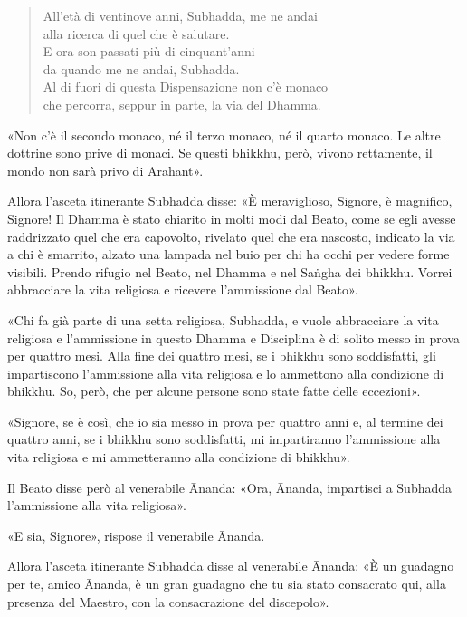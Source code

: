 \begin{quote}
All’età di ventinove anni, Subhadda, me ne andai \\
alla ricerca di quel che è salutare. \\
E ora son passati più di cinquant’anni \\
da quando me ne andai, Subhadda. \\
Al di fuori di questa Dispensazione non c’è monaco \\
che percorra, seppur in parte, la via del Dhamma.
\end{quote}

«Non c’è il secondo monaco, né il terzo monaco, né il quarto monaco. Le altre
dottrine sono prive di monaci. Se questi bhikkhu, però, vivono rettamente, il
mondo non sarà privo di Arahant».

Allora l’asceta itinerante Subhadda disse: «È meraviglioso, Signore, è
magnifico, Signore! Il Dhamma è stato chiarito in molti modi dal Beato, come se
egli avesse raddrizzato quel che era capovolto, rivelato quel che era nascosto,
indicato la via a chi è smarrito, alzato una lampada nel buio per chi ha occhi
per vedere forme visibili. Prendo rifugio nel Beato, nel Dhamma e nel Saṅgha dei
bhikkhu. Vorrei abbracciare la vita religiosa e ricevere l’ammissione dal
Beato».

«Chi fa già parte di una setta religiosa, Subhadda, e vuole abbracciare la vita
religiosa e l’ammissione in questo Dhamma e Disciplina è di solito messo in
prova per quattro mesi. Alla fine dei quattro mesi, se i bhikkhu sono
soddisfatti, gli impartiscono l’ammissione alla vita religiosa e lo ammettono
alla condizione di bhikkhu. So, però, che per alcune persone sono state fatte
delle eccezioni».

«Signore, se è così, che io sia messo in prova per quattro anni e, al termine
dei quattro anni, se i bhikkhu sono soddisfatti, mi impartiranno l’ammissione
alla vita religiosa e mi ammetteranno alla condizione di bhikkhu».

Il Beato disse però al venerabile Ānanda: «Ora, Ānanda, impartisci a Subhadda
l’ammissione alla vita religiosa».

«E sia, Signore», rispose il venerabile Ānanda.

Allora l’asceta itinerante Subhadda disse al venerabile Ānanda:
«È un guadagno per te, amico Ānanda, è un gran guadagno che tu sia stato
consacrato qui, alla presenza del Maestro, con la consacrazione del discepolo».

